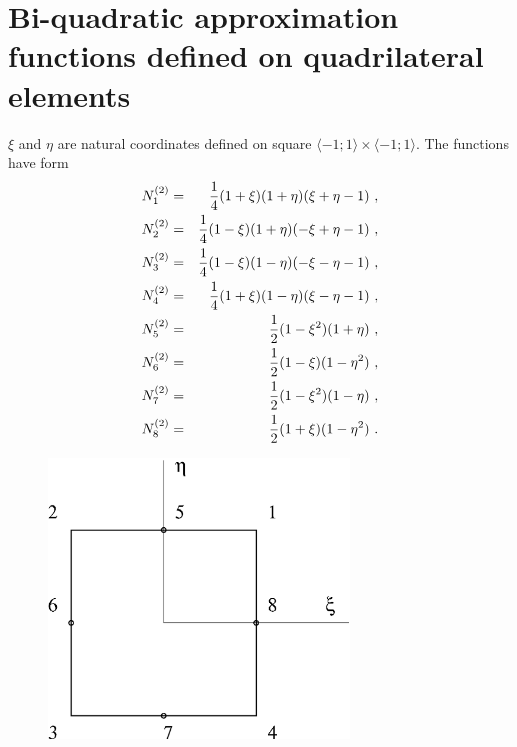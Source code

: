 \section{Bi-quadratic approximation functions defined on quadrilateral elements}
$\xi$ and $\eta$ are natural coordinates defined on square $\langle-1;1\rangle\times\langle-1;1\rangle$. The functions
have form
\begin{eqnarray}
\label{bfquadquadn1}
N_1^{(2)} &=& \del{1}{4} (1 + \xi) (1 + \eta) (\xi + \eta - 1)\ ,
\\
\label{bfquadquadn2}
N_2^{(2)} &=& \del{1}{4} (1 - \xi) (1 + \eta) (- \xi + \eta - 1)\ ,
\\
\label{bfquadquadn3}
N_3^{(2)} &=& \del{1}{4} (1 - \xi) (1 - \eta) (- \xi - \eta - 1)\ ,
\\
\label{bfquadquadn4}
N_4^{(2)} &=& \del{1}{4} (1 + \xi) (1 - \eta) (\xi - \eta - 1)\ ,
\\
\label{bfquadquadn5}
N_5^{(2)} &=& \del{1}{2} (1 - \xi^2) (1 + \eta)\ ,
\\
\label{bfquadquadn6}
N_6^{(2)} &=& \del{1}{2} (1 - \xi) (1 - \eta^2)\ ,
\\
\label{bfquadquadn7}
N_7^{(2)} &=& \del{1}{2} (1 - \xi^2) (1 - \eta)\ ,
\\
\label{bfquadquadn8}
N_8^{(2)} &=& \del{1}{2} (1 + \xi) (1 - \eta^2)\ .
\end{eqnarray}
\begin{figure}
\begin{center}
\includegraphics[width=80mm]{FIG/quadquad.eps}
\end{center}
\end{figure}

